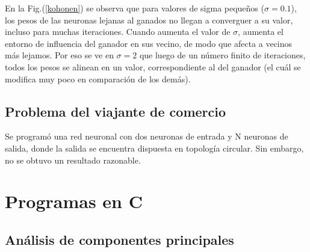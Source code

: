 \documentclass[aps,prb,onecolumn,10pt,floatfix,superscriptaddress]{article} %
\begin{document}
En la Fig.(\ref{kohonen}) se observa que para valores de sigma peque\~nos ($\sigma = 0.1$), los pesos de las neuronas lejanas al ganados no llegan a converguer a su valor, incluso para muchas iteraciones. Cuando aumenta el valor de $\sigma$, aumenta el entorno de influencia del ganador en sus vecino, de modo que afecta a vecinos m\'as lejamos. Por eso se ve en $\sigma = 2$ que luego de un n\'umero finito de iteraciones, todos los pesos se alinean en un valor, correspondiente al del ganador (el cu\'al se modifica muy poco en comparaci\'on de los dem\'as).

\subsection{Problema del viajante de comercio}

Se program\'o una red neuronal con dos neuronas de entrada y N neuronas de salida, donde la salida se encuentra dispuesta en topolog\'ia circular. Sin embargo, no se obtuvo un resultado razonable.

\section{Programas en C}

\subsection{An\'alisis de componentes principales}
\end{document}
